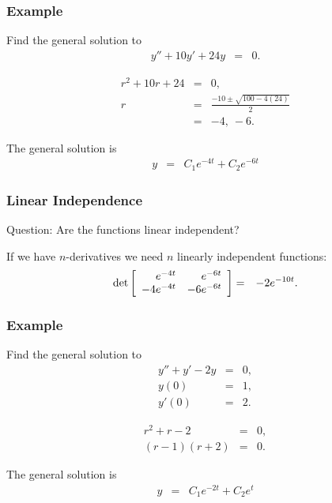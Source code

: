 \begin{frame}
  \frametitle{Example}

  Find the general solution to
  \begin{eqnarray*}
    y'' + 10 y' + 24y & = & 0.
  \end{eqnarray*}

  {
    \begin{eqnarray*}
      r^2 + 10r + 24 & = & 0, \\
      r & = & \frac{-10\pm\sqrt{100-4(24)}}{2} \\
      & = & -4,~ -6.
    \end{eqnarray*}

    The general solution is
    \begin{eqnarray*}
      y & = & C_1 e^{-4t} + C_2 e^{-6t}
    \end{eqnarray*}

  }
  

\end{frame}

\begin{frame}
  \frametitle{Linear Independence}

  Question: Are the functions linear independent?

  {

    If we have $n$-derivatives we need $n$ linearly independent
    functions:
    \begin{eqnarray*}
      \mathrm{det}\left[ \begin{array}{rr} e^{-4t} & e^{-6t} \\ -4e^{-4t} & -6e^{-6t} \end{array} \right] 
      & = & -2 e^{-10t}.
    \end{eqnarray*}

  }
  
\end{frame}


\begin{frame}
  \frametitle{Example}

  Find the general solution to
  \begin{eqnarray*}
    y'' + y' - 2y & = & 0, \\
    y(0) & = & 1, \\
    y'(0) & = & 2.
  \end{eqnarray*}

  {
    \begin{eqnarray*}
      r^2 + r - 2 & = & 0, \\
      (r-1)(r+2) & = & 0.
    \end{eqnarray*}

    The general solution is
    \begin{eqnarray*}
      y & = & C_1 e^{-2t} + C_2 e^{t}
    \end{eqnarray*}

  }
  

\end{frame}

